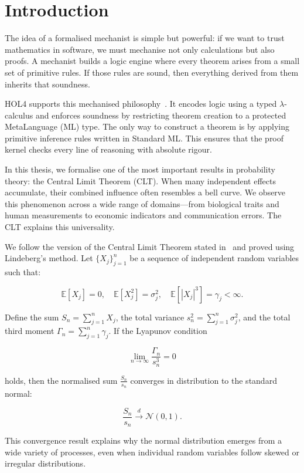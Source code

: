 \chapter[Introduction]{Introduction}
\label{chap:1}

The idea of a formalised mechanist is simple but powerful: if we want to trust mathematics in software, we must mechanise not only calculations but also proofs. A mechanist builds a logic engine where every theorem arises from a small set of primitive rules. If those rules are sound, then everything derived from them inherits that soundness.

HOL4 supports this mechanised philosophy~\cite{slind2008brief}. It encodes logic using a typed \(\lambda\)-calculus and enforces soundness by restricting theorem creation to a protected MetaLanguage (ML) type. The only way to construct a theorem is by applying primitive inference rules written in Standard ML. This ensures that the proof kernel checks every line of reasoning with absolute rigour.

In this thesis, we formalise one of the most important results in probability theory: the Central Limit Theorem (CLT). When many independent effects accumulate, their combined influence often resembles a bell curve. We observe this phenomenon across a wide range of domains—from biological traits and human measurements to economic indicators and communication errors. The CLT explains this universality.

We follow the version of the Central Limit Theorem stated in~\cite{chung2000course} and proved using Lindeberg’s method. Let $\{X_j\}_{j=1}^n$ be a sequence of independent random variables such that:

$$
\mathbb{E}[X_j] = 0,\quad \mathbb{E}[X_j^2] = \sigma_j^2,\quad \mathbb{E}[|X_j|^3] = \gamma_j < \infty.
$$

Define the sum $S_n = \sum_{j=1}^n X_j$, the total variance $s_n^2 = \sum_{j=1}^n \sigma_j^2$, and the total third moment $\Gamma_n = \sum_{j=1}^n \gamma_j$. If the Lyapunov condition

$$
\lim_{n \to \infty} \frac{\Gamma_n}{s_n^3} = 0
$$

holds, then the normalised sum \(\frac{S_n}{s_n}\) converges in distribution to the standard normal:

$$
\frac{S_n}{s_n} \xrightarrow{d} \mathcal{N}(0, 1).
$$

This convergence result explains why the normal distribution emerges from a wide variety of processes, even when individual random variables follow skewed or irregular distributions.

